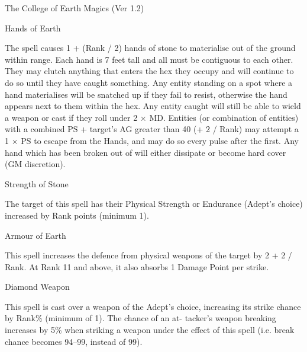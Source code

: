 \begin{Chapter}{The College of Earth Magics (Ver 1.2)}
\begin{spell}[S-2]{Hands of Earth }
\begin{effects}
The spell causes 1 + (Rank / 2) hands of stone to materialise out of
the ground within range.  Each hand is 7 feet tall and all must be
contiguous to each other. They may clutch anything that enters the hex
they occupy and will continue to do so until they have caught
something.  Any entity standing on a spot where a hand materialises
will be snatched up if they fail to resist, otherwise the hand appears
next to them within the hex.  Any entity caught will still be able to
wield a weapon or cast if they roll under 2 × MD. Entities (or
combination of entities) with a combined PS + target’s AG greater than
40 (+ 2 / Rank) may attempt a 1 × PS to escape from the Hands, and may
do so every pulse after the first.  Any hand which has been broken out
of will either dissipate or become hard cover (GM discretion).
\end{effects}
\end{spell}

\begin{spell}[S-3]{Strength of Stone }

\begin{effects}
The target of this spell has their Physical Strength or Endurance
(Adept’s choice) increased by Rank points (minimum 1).
\end{effects}
\end{spell}

\begin{spell}[S-4]{Armour of Earth }

\begin{effects}
This spell increases the defence from physical weapons of the target
by 2 + 2 / Rank.  At Rank 11 and above, it also absorbs 1 Damage Point
per strike.

\end{effects}
\end{spell}

\begin{spell}[S-5]{Diamond Weapon }

\begin{effects}
This spell is cast over a weapon of the Adept’s choice, increasing its
strike chance by Rank\% (minimum of 1).  The chance of an at- tacker’s
weapon breaking increases by 5\% when striking a weapon under the
effect of this spell (i.e.  break chance becomes 94–99, instead of
99).
\end{effects}
\end{spell}


\end{Chapter}
